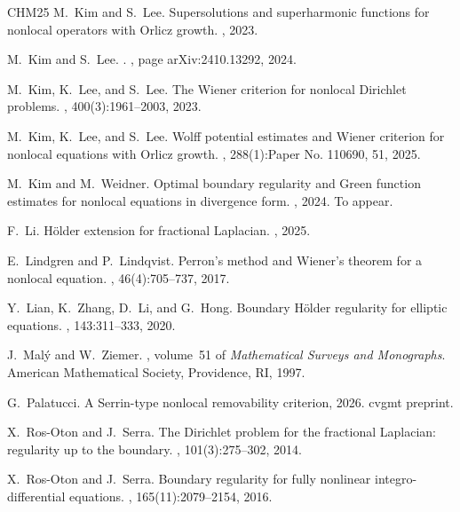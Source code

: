 \documentclass[11pt]{amsart}
\theoremstyle{plain}
\theoremstyle{definition}
\numberwithin{equation}{section}
\begin{document}
\begin{thebibliography}{CHM{\etalchar{+}}25}
M.~Kim and S.~Lee.
\newblock Supersolutions and superharmonic functions for nonlocal operators
  with {O}rlicz growth.
, 2023.

M.~{Kim} and S.~{Lee}.
.
, page arXiv:2410.13292, 2024.

M.~Kim, K.~Lee, and S.~Lee.
\newblock The {W}iener criterion for nonlocal {D}irichlet problems.
, 400(3):1961--2003, 2023.

M.~Kim, K.~Lee, and S.~Lee.
\newblock Wolff potential estimates and {W}iener criterion for nonlocal
  equations with {O}rlicz growth.
, 288(1):Paper No. 110690, 51, 2025.

M.~Kim and M.~Weidner.
\newblock Optimal boundary regularity and {G}reen function estimates for
  nonlocal equations in divergence form.
, 2024.
\newblock To appear.

F.~Li.
\newblock H\"older extension for fractional {L}aplacian.
, 2025.

E.~Lindgren and P.~Lindqvist.
\newblock Perron's method and {W}iener's theorem for a nonlocal equation.
, 46(4):705--737, 2017.

Y.~Lian, K.~Zhang, D.~Li, and G.~Hong.
\newblock Boundary {H}\"older regularity for elliptic equations.
, 143:311--333, 2020.

J.~Mal\'y and W.~Ziemer.
, volume~51 of {\em Mathematical Surveys and Monographs}.
\newblock American Mathematical Society, Providence, RI, 1997.

G.~Palatucci.
\newblock A {S}errin-type nonlocal removability criterion, 2026.
\newblock cvgmt preprint.

X.~Ros-Oton and J.~Serra.
\newblock The {D}irichlet problem for the fractional {L}aplacian: regularity up
  to the boundary.
, 101(3):275--302, 2014.

X.~Ros-Oton and J.~Serra.
\newblock Boundary regularity for fully nonlinear integro-differential
  equations.
, 165(11):2079--2154, 2016.


\end{thebibliography}
\end{document}
